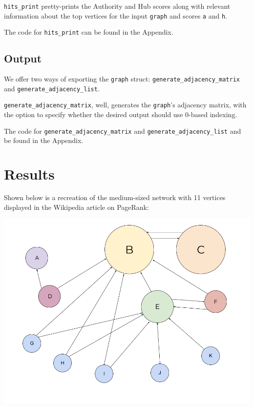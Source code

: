 \documentclass[12pt, titlepage, twoside]{amsart}
\begin{document}
\texttt{hits_print} pretty-prints the Authority and Hub scores along with relevant information
about the top vertices for the input \texttt{graph} and scores \texttt{a} and \texttt{h}.

The code for \texttt{hits_print} can be found in the Appendix.

\subsection{Output}

We offer two ways of exporting the \texttt{graph} struct: \texttt{generate_adjacency_matrix}
and \texttt{generate_adjacency_list}.

\texttt{generate_adjacency_matrix}, well, generates the \texttt{graph}'s adjacency matrix,
with the option to specify whether the desired output should use 0-based indexing.

The code for \texttt{generate_adjacency_matrix} and \texttt{generate_adjacency_list} and be
found in the Appendix.

\section{Results}

Shown below is a recreation of the medium-sized network with 11 vertices displayed in
the Wikipedia article on PageRank:

\includegraphics[width=\textwidth]{Wikipedia_Medium-graph.png}
\end{document}
